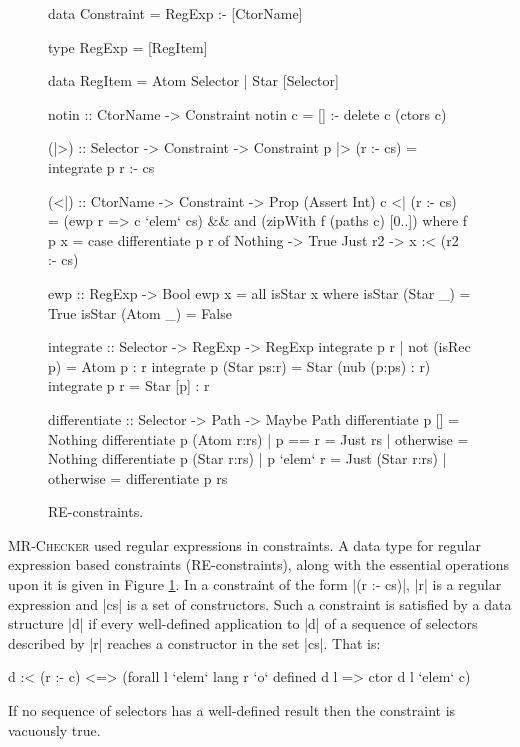 \documentclass[preprint]{sigplanconf}
\newcommand{\catch}{\textsc{Catch}}
\newcommand{\oldtool}{\anon{\catch05}{\textsc{MR-Checker}}}
\newcommand{\anon}[2]{#2}
\begin{document}
\begin{figure}
\begin{code}
data Constraint = RegExp :- [CtorName]

type RegExp = [RegItem]

data RegItem  =  Atom  Selector
              |  Star  [Selector]

notin :: CtorName -> Constraint
notin c = [] :- delete c (ctors c)

(|>) :: Selector -> Constraint -> Constraint
p |> (r :- cs) = integrate p r :- cs

(<|) :: CtorName -> Constraint -> Prop (Assert Int)
c <| (r :- cs) = (ewp r => c `elem` cs) &&
    and (zipWith f (paths c) [0..])
    where
    f p x = case  differentiate p r of
                  Nothing  -> True
                  Just r2  -> x :< (r2 :- cs)

ewp :: RegExp -> Bool
ewp x = all isStar x
   where  isStar (Star  _) = True
          isStar (Atom  _) = False

integrate :: Selector -> RegExp -> RegExp
integrate p r | not (isRec p)  = Atom p : r
integrate p (Star ps:r)        = Star (nub (p:ps) : r)
integrate p r                  = Star [p] : r

differentiate :: Selector -> Path -> Maybe Path
differentiate p [] = Nothing
differentiate p (Atom  r:rs)  | p == r     = Just rs
                              | otherwise  = Nothing
differentiate p (Star  r:rs)  | p `elem` r  = Just (Star r:rs)
                              | otherwise   = differentiate p rs
\end{code}
\caption{RE-constraints.}
\label{fig:regexp}
\end{figure}

\oldtool{} used regular expressions in constraints. A data type for regular expression based constraints (RE-constraints), along with the essential operations upon it is given in Figure \ref{fig:regexp}. In a constraint of the form |(r :- cs)|, |r| is a regular expression and |cs| is a set of constructors. Such a constraint is satisfied by a data structure |d| if every well-defined application to |d| of a sequence of selectors described by |r| reaches a constructor in the set |cs|. That is:

\begin{code}
d :< (r :- c) <=> (forall l `elem` lang r `o` defined d l => ctor d l `elem` c)
\end{code}

If no sequence of selectors has a well-defined result then the constraint is vacuously true.
\end{document}
